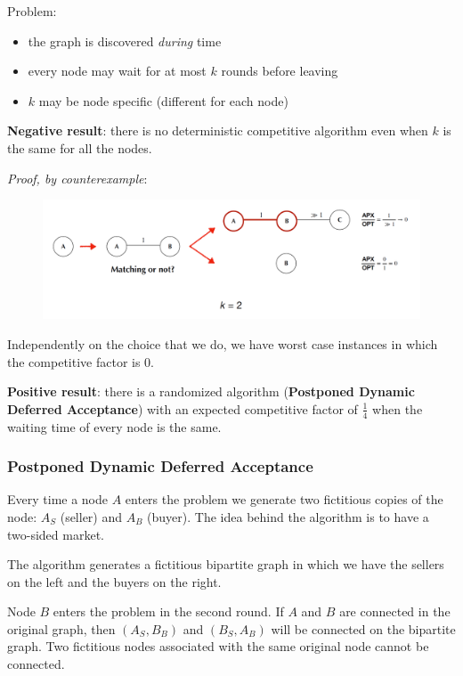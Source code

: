 \documentclass[10pt,a4paper]{article}
\begin{document}
Problem:

\begin{itemize}

\item the graph is discovered \textit{during} time
\item every node may wait for at most $k$ rounds before leaving
\item $k$ may be node specific (different for each node)
\end{itemize}

\textbf{Negative result}: there is no deterministic competitive algorithm even when $k$ is the same for all the nodes.
\newline

\textit{Proof, by counterexample}:

\begin{figure}[htbp]
\centering
\includegraphics[width=\textwidth]{images/img_01.png}
\end{figure}

Independently on the choice that we do, we have worst case instances in which the competitive factor is 0.

\textbf{Positive result}: there is a randomized algorithm (\textbf{Postponed Dynamic Deferred Acceptance}) with an expected competitive factor of $\frac{1}{4}$ when the waiting time of every node is the same.

\subsubsection{Postponed Dynamic Deferred Acceptance}\label{postponed-dynamic-deferred-acceptance}

Every time a node $A$ enters the problem we generate two fictitious copies of the node: $A_S$ (seller) and $A_B$ (buyer). The idea behind the algorithm is to have a two-sided market.

The algorithm generates a fictitious bipartite graph in which we have the sellers on the left and the buyers on the right.

Node $B$ enters the problem in the second round. If $A$ and $B$ are connected in the original graph, then $(A_S, B_B)$ and $(B_S, A_B)$ will be connected on the bipartite graph. Two fictitious nodes associated with the same original node cannot be connected.
\end{document}
